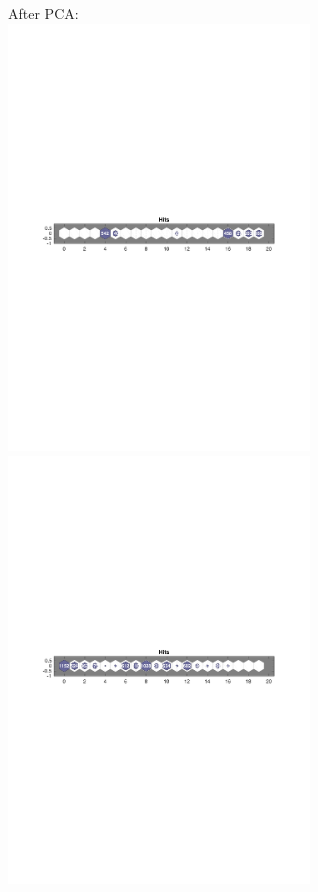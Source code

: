 \documentclass[10pt, oneside]{article}
\begin{document}
\begin{figure}[h]
\begin{center}
After PCA:\\
\includegraphics[width=8cm]{pca-fail1-ones.pdf} \includegraphics[width=8cm]{pca-fail1-zeros.pdf}

\end{center}
\end{figure}
\end{document}
